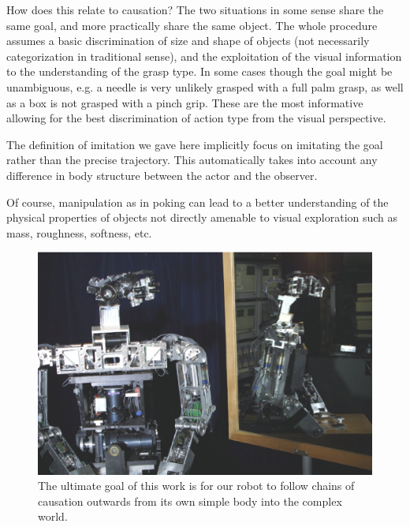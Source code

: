 \ifverbose
How does this relate to causation?  The two situations in some sense
share the same goal, and more practically share the same object.  The
whole procedure assumes a basic discrimination of size and shape of
objects (not necessarily categorization in traditional sense), and the
exploitation of the visual information to the understanding of the
grasp type. In some cases though the goal might be unambiguous, e.g. a
needle is very unlikely grasped with a full palm grasp, as well as a
box is not grasped with a pinch grip. These are the most informative
allowing for the best discrimination of action type from the visual
perspective.
\fi

\ifverbose
The definition of imitation we gave here implicitly focus on imitating
the goal rather than the precise trajectory. This automatically takes
into account any difference in body structure between the actor and
the observer.

Of course, manipulation as in poking can lead to a better
understanding of the physical properties of objects not directly
amenable to visual exploration such as mass, roughness, softness, etc.
\fi

\begin{figure}[tbh]
\begin{center}
\includegraphics[width=\columnwidth]{mirror-cog.eps}
\caption{ 
\label{fig:mirror-cog}
%
The ultimate goal of this work is for our robot to follow chains of
causation outwards from its own simple body into the complex world.
%
}
\end{center}
\end{figure}


